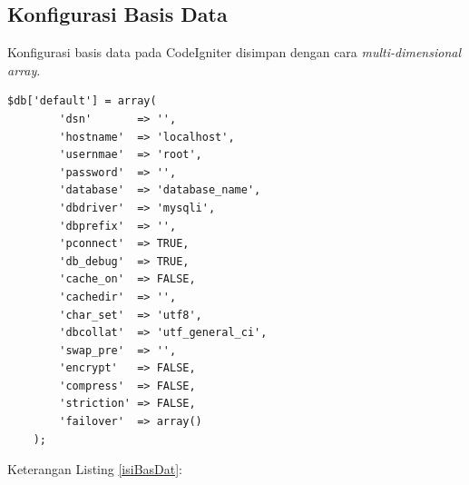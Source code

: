 	\subsection{Konfigurasi Basis Data}
	\label{sub: databaseConf}
	
	Konfigurasi basis data pada CodeIgniter disimpan dengan cara \textit{multi-dimensional array}.
	
	\begin{lstlisting}[caption=Array Basis Data, label=isiBasDat]
$db['default'] = array(
		'dsn'		=> '',
		'hostname'	=> 'localhost',
		'usernmae'	=> 'root',
		'password'	=> '',
		'database'	=> 'database_name',
		'dbdriver'	=> 'mysqli',
		'dbprefix'	=> '',
		'pconnect'	=> TRUE,
		'db_debug'	=> TRUE,
		'cache_on'	=> FALSE,
		'cachedir'	=> '',
		'char_set'	=> 'utf8',
		'dbcollat'	=> 'utf_general_ci',
		'swap_pre'	=> '',
		'encrypt'	=> FALSE,
		'compress'	=> FALSE,
		'striction'	=> FALSE,
		'failover'	=> array()
	);
	\end{lstlisting}
	\pagebreak
	Keterangan Listing \ref{isiBasDat}:
